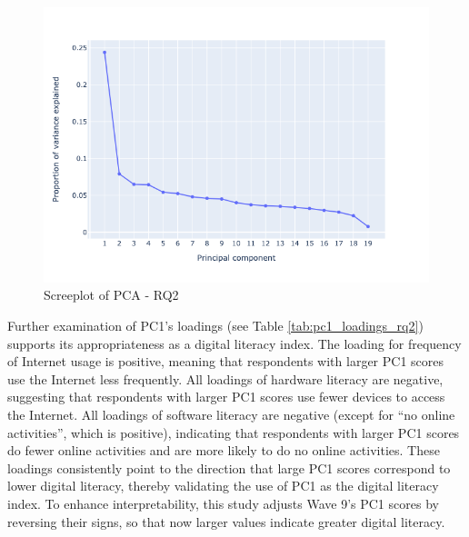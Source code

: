 \begin{figure}
    \centering
    \caption{Screeplot of PCA - RQ2}
    \label{fig:screeplot_rq2}
    \includegraphics[width=\textwidth]{figures/pca_screeplot_q2.png}
\end{figure}

Further examination of PC1's loadings (see Table \ref{tab:pc1_loadings_rq2}) supports its appropriateness as a digital literacy index. The loading for frequency of Internet usage is positive, meaning that respondents with larger PC1 scores use the Internet less frequently. All loadings of hardware literacy are negative, suggesting that respondents with larger PC1 scores use fewer devices to access the Internet. All loadings of software literacy are negative (except for ``no online activities”, which is positive), indicating that respondents with larger PC1 scores do fewer online activities and are more likely to do no online activities. These loadings consistently point to the direction that large PC1 scores correspond to lower digital literacy, thereby validating the use of PC1 as the digital literacy index. To enhance interpretability, this study adjusts Wave 9's PC1 scores by reversing their signs, so that now larger values indicate greater digital literacy.

